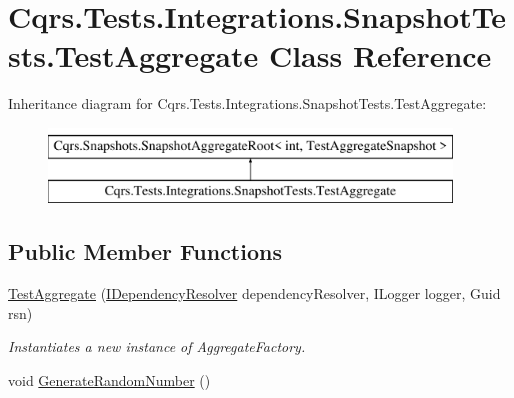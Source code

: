 \hypertarget{classCqrs_1_1Tests_1_1Integrations_1_1SnapshotTests_1_1TestAggregate}{}\section{Cqrs.\+Tests.\+Integrations.\+Snapshot\+Tests.\+Test\+Aggregate Class Reference}
\label{classCqrs_1_1Tests_1_1Integrations_1_1SnapshotTests_1_1TestAggregate}
Inheritance diagram for Cqrs.\+Tests.\+Integrations.\+Snapshot\+Tests.\+Test\+Aggregate\+:\begin{figure}[H]
\begin{center}
\leavevmode
\includegraphics[height=2.000000cm]{classCqrs_1_1Tests_1_1Integrations_1_1SnapshotTests_1_1TestAggregate}
\end{center}
\end{figure}
\subsection*{Public Member Functions}
\begin{DoxyCompactItemize}
\item 
\hyperlink{classCqrs_1_1Tests_1_1Integrations_1_1SnapshotTests_1_1TestAggregate_a7ce466d762d07050e09c5361b9409172_a7ce466d762d07050e09c5361b9409172}{Test\+Aggregate} (\hyperlink{interfaceCqrs_1_1Configuration_1_1IDependencyResolver}{I\+Dependency\+Resolver} dependency\+Resolver, I\+Logger logger, Guid rsn)
\begin{DoxyCompactList}\small\item\em Instantiates a new instance of Aggregate\+Factory. \end{DoxyCompactList}\item 
void \hyperlink{classCqrs_1_1Tests_1_1Integrations_1_1SnapshotTests_1_1TestAggregate_a8b34f0ab097cb730ab601feded496682_a8b34f0ab097cb730ab601feded496682}{Generate\+Random\+Number} ()
\end{DoxyCompactItemize}
